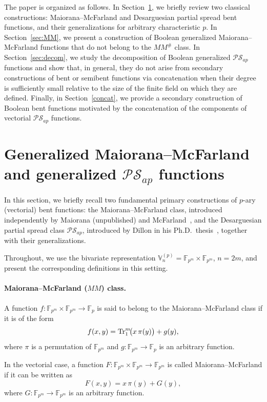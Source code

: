 \documentclass[12pt]{article}
\theoremstyle{plain}
\theoremstyle{definition}
\newcommand{\V}{\mathbb{V}}
\renewcommand{\to}{\rightarrow}
\newcommand{\Tr}{{\rm Tr}}
\begin{document}
	The paper is organized as follows. In Section~\ref{sec:MP}, we briefly review two classical constructions: 
	Maiorana--McFarland and Desarguesian partial spread bent functions, 
	and their generalizations for arbitrary characteristic $p$.
	In Section~\ref{sec:MM}, we present a construction of Boolean generalized Maiorana--McFarland functions that do not belong to the \(MM^{\#}\) class. In Section~\ref{sec:decom}, we study the decomposition of Boolean generalized $\mathcal{PS}_{ap}$ functions and show that, in general, they do not arise from secondary constructions of bent or semibent functions via concatenation when their degree is sufficiently small relative to the size of the finite field on which they are defined. Finally, in Section~\ref{concat}, we provide a secondary construction of Boolean bent functions motivated by the concatenation of the components of vectorial $\mathcal{PS}_{ap}$ functions.

	
	\section{Generalized Maiorana--McFarland and generalized $\mathcal{PS}_{ap}$ functions} \label{sec:MP}
	
	In this section, we briefly recall two fundamental primary constructions of
	\(p\)-ary (vectorial) bent functions: the
	Maiorana--McFarland class, introduced independently by Maiorana (unpublished)
	and McFarland~\cite{mm}, and the Desarguesian partial spread class
	\(\mathcal{PS}_{ap}\), introduced by Dillon in his Ph.D.\ thesis~\cite{dillon},
	together with their generalizations.
	
	Throughout, we use the bivariate representation $\V_n^{(p)}= \mathbb{F}_{p^m} \times \mathbb{F}_{p^m}$, $n = 2m$,
	and present the corresponding definitions in this setting.
	
	\paragraph{Maiorana--McFarland (\(MM\)) class.}
	A function $f : \mathbb{F}_{p^m} \times \mathbb{F}_{p^m} \to \mathbb{F}_p$
	is said to belong to the Maiorana--McFarland class if it is of the form
	\[
	f(x,y) = \Tr_1^m\!\bigl(x\,\pi(y)\bigr) + g(y),
	\]
	where \(\pi\) is a permutation of \(\mathbb{F}_{p^m}\) and
	\(g : \mathbb{F}_{p^m} \to \mathbb{F}_p\) is an arbitrary function.
	
	In the vectorial case, a function $F : \mathbb{F}_{p^m} \times \mathbb{F}_{p^m} \to \mathbb{F}_{p^m}$
	is called Maiorana--McFarland if it can be written as
	\[
	F(x,y) = x\,\pi(y) + G(y),
	\]
	where \(G : \mathbb{F}_{p^m} \to \mathbb{F}_{p^m}\) is an arbitrary function.
	
\end{document}
